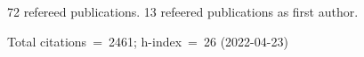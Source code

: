 72 refereed publications. 13 refeered publications as first author.

Total citations~=~2461; h-index~=~26 (2022-04-23)